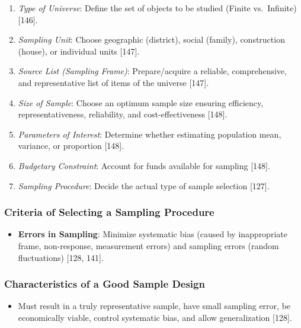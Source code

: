 \documentclass[
]{article}
\providecommand{\tightlist}{%
  \setlength{\itemsep}{0pt}\setlength{\parskip}{0pt}}
\begin{document}
\begin{enumerate}
\def\labelenumi{\arabic{enumi}.}
\tightlist
\item
  \emph{Type of Universe}: Define the set of objects to be studied
  (Finite vs.~Infinite) {[}146{]}.
\item
  \emph{Sampling Unit}: Choose geographic (district), social (family),
  construction (house), or individual units {[}147{]}.
\item
  \emph{Source List (Sampling Frame)}: Prepare/acquire a reliable,
  comprehensive, and representative list of items of the universe
  {[}147{]}.
\item
  \emph{Size of Sample}: Choose an optimum sample size ensuring
  efficiency, representativeness, reliability, and cost-effectiveness
  {[}148{]}.
\item
  \emph{Parameters of Interest}: Determine whether estimating population
  mean, variance, or proportion {[}148{]}.
\item
  \emph{Budgetary Constraint}: Account for funds available for sampling
  {[}148{]}.
\item
  \emph{Sampling Procedure}: Decide the actual type of sample selection
  {[}127{]}.
\end{enumerate}

\subsubsection{Criteria of Selecting a Sampling
Procedure}\label{criteria-of-selecting-a-sampling-procedure}

\begin{itemize}
\tightlist
\item
  \textbf{Errors in Sampling}: Minimize systematic bias (caused by
  inappropriate frame, non-response, measurement errors) and sampling
  errors (random fluctuations) {[}128, 141{]}.
\end{itemize}

\subsubsection{Characteristics of a Good Sample
Design}\label{characteristics-of-a-good-sample-design}

\begin{itemize}
\tightlist
\item
  Must result in a truly representative sample, have small sampling
  error, be economically viable, control systematic bias, and allow
  generalization {[}128{]}.
\end{itemize}
\end{document}
